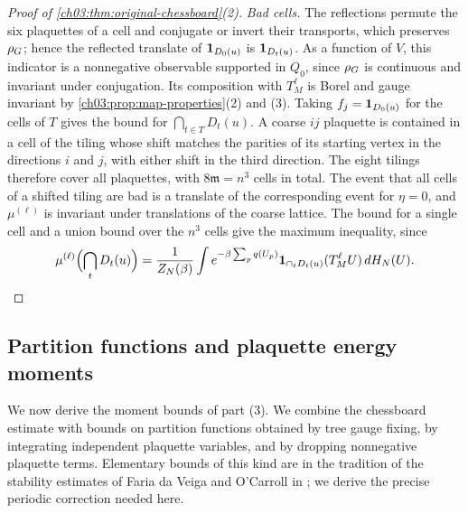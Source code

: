\begin{proof}[Proof of \cref{ch03:thm:original-chessboard}(2)]
\emph{Bad cells.} The reflections permute the six plaquettes of a cell and conjugate or invert their transports, which preserves $\rho_G$; hence the reflected translate of $\mathbf 1_{D_0(u)}$ is $\mathbf 1_{D_t(u)}$. As a function of $V$, this indicator is a nonnegative observable supported in $Q_0$, since $\rho_G$ is continuous and invariant under conjugation. Its composition with $T_M^\ell$ is Borel and gauge invariant by \cref{ch03:prop:map-properties}(2) and (3). Taking $f_j=\mathbf 1_{D_0(u)}$ for the cells of $T$ gives the bound for $\bigcap_{t\in T}D_t(u)$. A coarse $ij$ plaquette is contained in a cell of the tiling whose shift matches the parities of its starting vertex in the directions $i$ and $j$, with either shift in the third direction. The eight tilings therefore cover all plaquettes, with $8\mathfrak m=n^3$ cells in total. The event that all cells of a shifted tiling are bad is a translate of the corresponding event for $\eta=0$, and $\mu^{(\ell)}$ is invariant under translations of the coarse lattice. The bound for a single cell and a union bound over the $n^3$ cells give the maximum inequality, since
\[
 \mu^{(\ell)}\Bigl(\bigcap_tD_t(u)\Bigr)=\frac{1}{Z_N(\beta)}\int e^{-\beta\sum_pq(U_p)}\mathbf 1_{\cap_tD_t(u)}(T_M^\ell U)\,dH_N(U).
\]
\end{proof}

\subsection{Partition functions and plaquette energy moments}\label{ch03:sec:energy-proof}

We now derive the moment bounds of part (3). We combine the chessboard estimate with bounds on partition functions obtained by tree gauge fixing, by integrating independent plaquette variables, and by dropping nonnegative plaquette terms. Elementary bounds of this kind are in the tradition of the stability estimates of Faria da Veiga and O'Carroll in \cite{FariaVeigaOCarroll2019,FariaVeigaOCarroll2025}; we derive the precise periodic correction needed here.

